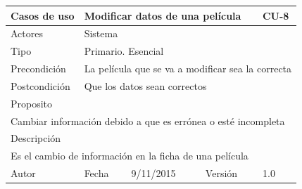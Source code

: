\documentclass{article}
\begin{document}
\begin{table}[h]
\begin{tabular}{|l|l|l|l|l|l|}
\hline
\multicolumn{2}{|p{2cm}|}{Casos de uso}  & \multicolumn{3}{p{7cm}|}{Modificar datos de una película} & CU-8 \\
\hline
\multicolumn{2}{|p{2cm}|}{Actores}       & \multicolumn{4}{p{8cm}|}{Sistema}        \\
\hline
\multicolumn{2}{|p{2cm}|}{Tipo}          & \multicolumn{4}{p{8cm}|}{Primario. Esencial}        \\
\hline
\multicolumn{2}{|p{2cm}|}{Precondición}  & \multicolumn{4}{p{8cm}|}{La película que se va a modificar sea la correcta}        \\
\hline
\multicolumn{2}{|p{2cm}|}{Postcondición} & \multicolumn{4}{p{8cm}|}{Que los datos sean correctos}        \\
\hline
\multicolumn{6}{|p{10cm}|}{Proposito}                                   \\
\hline
\multicolumn{6}{|p{10cm}|}{Cambiar información debido a que es errónea o esté incompleta}                                            \\
\hline
\multicolumn{6}{|p{10cm}|}{Descripción}                                 \\
\hline
\multicolumn{6}{|p{10cm}|}{Es el cambio de información en la ficha de una película}                                            \\
\hline
Autor              &              & Fecha    & 9/11/2015    &   Versión  &1.0\\
\hline
\end{tabular}
\end{table}
\end{document}
